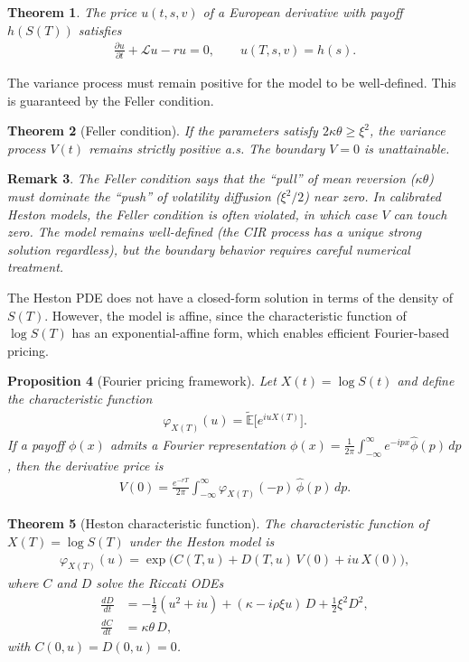 \documentclass{report}
\theoremstyle{spacedplain}
\newtheorem{theorem}{Theorem}[section]
\newtheorem{proposition}[theorem]{Proposition}
\theoremstyle{spaceddefinition}
\theoremstyle{spacedremark}
\newtheorem{remark}[theorem]{Remark}
\begin{document}
\begin{theorem}
The price $u(t,s,v)$ of a European derivative with payoff $h(S(T))$ satisfies
\begin{align}
    \frac{\partial u}{\partial t} + \mathcal{L}u - ru = 0, \qquad u(T,s,v) = h(s).
\end{align}
\end{theorem}

The variance process must remain positive for the model to be well-defined. This is guaranteed by the Feller condition.

\begin{theorem}[Feller condition]
If the parameters satisfy $2\kappa\theta \geq \xi^2$, the variance process $V(t)$ remains strictly positive a.s. The boundary $V = 0$ is unattainable.
\end{theorem}

\begin{remark}
The Feller condition says that the ``pull'' of mean reversion ($\kappa\theta$) must dominate the ``push'' of volatility diffusion ($\xi^2/2$) near zero. In calibrated Heston models, the Feller condition is often violated, in which case $V$ can touch zero. The model remains well-defined (the CIR process has a unique strong solution regardless), but the boundary behavior requires careful numerical treatment.
\end{remark}

The Heston PDE does not have a closed-form solution in terms of the density of $S(T)$. However, the model is affine, since the characteristic function of $\log S(T)$ has an exponential-affine form, which enables efficient Fourier-based pricing.

\begin{proposition}[Fourier pricing framework]
Let $X(t) = \log S(t)$ and define the characteristic function
\begin{align}
    \varphi_{X(T)}(u) = \widetilde{\mathbb{E}}\bigl[e^{iuX(T)}\bigr].
\end{align}
If a payoff $\phi(x)$ admits a Fourier representation $\phi(x) = \frac{1}{2\pi}\int_{-\infty}^{\infty} e^{-ipx}\hat{\phi}(p)\,dp$, then the derivative price is
\begin{align}
    V(0) = \frac{e^{-rT}}{2\pi}\int_{-\infty}^{\infty} \varphi_{X(T)}(-p)\,\hat{\phi}(p)\,dp.
\end{align}
\end{proposition}

\begin{theorem}[Heston characteristic function]
The characteristic function of $X(T) = \log S(T)$ under the Heston model is
\begin{align}
    \varphi_{X(T)}(u) = \exp\bigl(C(T,u) + D(T,u)\,V(0) + iu\,X(0)\bigr),
\end{align}
where $C$ and $D$ solve the Riccati ODEs
\begin{align}
    \frac{dD}{dt} &= -\frac{1}{2}(u^2 + iu) + (\kappa - i\rho\xi u)\,D + \frac{1}{2}\xi^2 D^2, \\
    \frac{dC}{dt} &= \kappa\theta\,D,
\end{align}
with $C(0,u) = D(0,u) = 0$.
\end{theorem}
\end{document}
